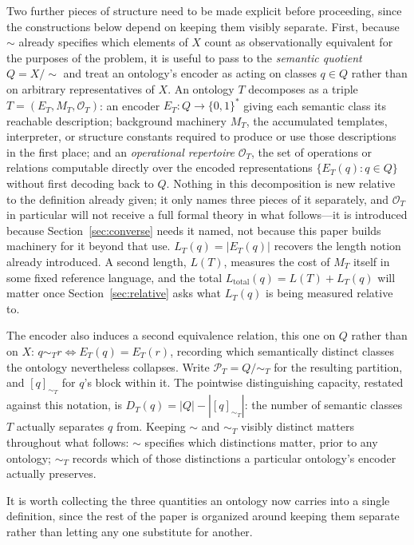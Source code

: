 \documentclass[11pt]{article}
\theoremstyle{plain}
\begin{document}
Two further pieces of structure need to be made explicit before proceeding, since the constructions below depend on keeping them visibly separate. First, because $\sim$ already specifies which elements of $X$ count as observationally equivalent for the purposes of the problem, it is useful to pass to the \emph{semantic quotient} $Q = X/\!\sim$ and treat an ontology's encoder as acting on classes $q \in Q$ rather than on arbitrary representatives of $X$. An ontology $T$ decomposes as a triple $T = (E_T, M_T, \mathcal{O}_T)$: an encoder $E_T : Q \to \{0,1\}^*$ giving each semantic class its reachable description; background machinery $M_T$, the accumulated templates, interpreter, or structure constants required to produce or use those descriptions in the first place; and an \emph{operational repertoire} $\mathcal{O}_T$, the set of operations or relations computable directly over the encoded representations $\{E_T(q) : q \in Q\}$ without first decoding back to $Q$. Nothing in this decomposition is new relative to the definition already given; it only names three pieces of it separately, and $\mathcal{O}_T$ in particular will not receive a full formal theory in what follows---it is introduced because Section~\ref{sec:converse} needs it named, not because this paper builds machinery for it beyond that use. $L_T(q) = |E_T(q)|$ recovers the length notion already introduced. A second length, $L(T)$, measures the cost of $M_T$ itself in some fixed reference language, and the total $L_{\mathrm{total}}(q) = L(T) + L_T(q)$ will matter once Section~\ref{sec:relative} asks what $L_T(q)$ is being measured relative to.

The encoder also induces a second equivalence relation, this one on $Q$ rather than on $X$: $q \sim_T r \iff E_T(q) = E_T(r)$, recording which semantically distinct classes the ontology nevertheless collapses. Write $\mathcal{P}_T = Q/\!\sim_T$ for the resulting partition, and $[q]_{\sim_T}$ for $q$'s block within it. The pointwise distinguishing capacity, restated against this notation, is $D_T(q) = |Q| - |[q]_{\sim_T}|$: the number of semantic classes $T$ actually separates $q$ from. Keeping $\sim$ and $\sim_T$ visibly distinct matters throughout what follows: $\sim$ specifies which distinctions matter, prior to any ontology; $\sim_T$ records which of those distinctions a particular ontology's encoder actually preserves.

It is worth collecting the three quantities an ontology now carries into a single definition, since the rest of the paper is organized around keeping them separate rather than letting any one substitute for another.
\end{document}

